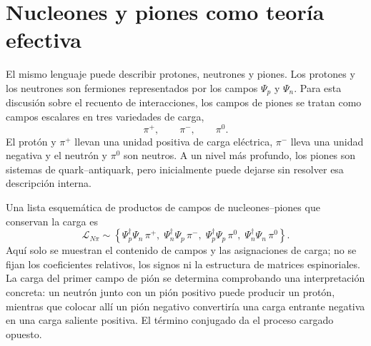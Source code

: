 \begin{classroomqa}
\end{classroomqa}

\section{Nucleones y piones como teoría efectiva}

El mismo lenguaje puede describir protones, neutrones y piones. Los protones y los neutrones son fermiones representados por los campos \(\Psi_p\) y \(\Psi_n\). Para esta discusión sobre el recuento de interacciones, los campos de piones se tratan como campos escalares en tres variedades de carga,
\begin{equation}
\pi^+,
\qquad
\pi^-,
\qquad
\pi^0.
\end{equation}
El protón y \(\pi^+\) llevan una unidad positiva de carga eléctrica, \(\pi^-\) lleva una unidad negativa y el neutrón y \(\pi^0\) son neutros. A un nivel más profundo, los piones son sistemas de quark--antiquark, pero inicialmente puede dejarse sin resolver esa descripción interna.

Una lista esquemática de productos de campos de nucleones--piones que conservan la carga es
\begin{equation}
\mathcal L_{N\pi}
\sim
\left\{
\Psi_p^\dagger\Psi_n\,\pi^+,\;
\Psi_n^\dagger\Psi_p\,\pi^-,\;
\Psi_p^\dagger\Psi_p\,\pi^0,\;
\Psi_n^\dagger\Psi_n\,\pi^0
\right\}.
\end{equation}
Aquí solo se muestran el contenido de campos y las asignaciones de carga; no se fijan los coeficientes relativos, los signos ni la estructura de matrices espinoriales. La carga del primer campo de pión se determina comprobando una interpretación concreta: un neutrón junto con un pión positivo puede producir un protón, mientras que colocar allí un pión negativo convertiría una carga entrante negativa en una carga saliente positiva. El término conjugado da el proceso cargado opuesto.

